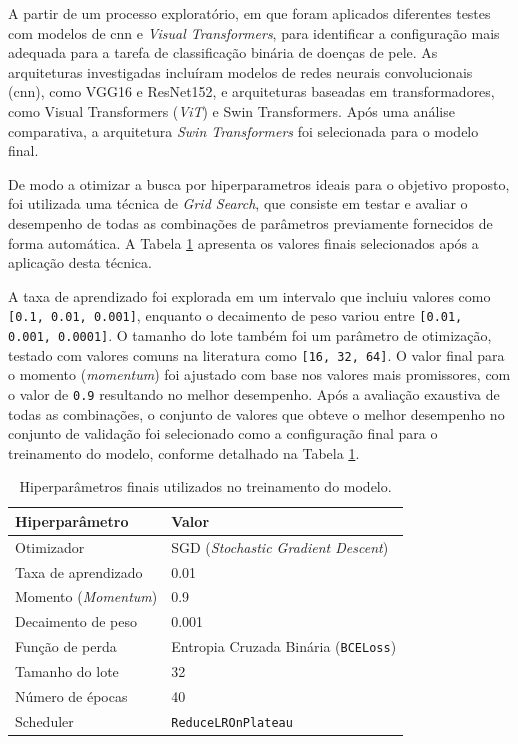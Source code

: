 A partir de um processo exploratório, em que foram aplicados diferentes testes com modelos de \gls{cnn} e \textit{Visual Transformers}, para identificar a configuração mais adequada para a tarefa de classificação binária de doenças de pele. As arquiteturas investigadas incluíram modelos de redes neurais convolucionais (\gls{cnn}), como VGG16 e ResNet152, e arquiteturas baseadas em transformadores, como Visual Transformers (\textit{ViT}) e Swin Transformers. Após uma análise comparativa, a arquitetura \textit{Swin Transformers} foi selecionada para o modelo final.

De modo a otimizar a busca por hiperparametros ideais para o objetivo proposto, foi utilizada uma técnica de \textit{Grid Search}, que consiste em testar e avaliar o desempenho de todas as combinações de parâmetros previamente fornecidos de forma automática. A Tabela \ref{tab: hiperparametros} apresenta os valores finais selecionados após a aplicação desta técnica.

A taxa de aprendizado foi explorada em um intervalo que incluiu valores como \texttt{[0.1, 0.01, 0.001]}, enquanto o decaimento de peso variou entre \texttt{[0.01, 0.001, 0.0001]}. O tamanho do lote também foi um parâmetro de otimização, testado com valores comuns na literatura como \texttt{[16, 32, 64]}. O valor final para o momento (\textit{momentum}) foi ajustado com base nos valores mais promissores, com o valor de \texttt{0.9} resultando no melhor desempenho. Após a avaliação exaustiva de todas as combinações, o conjunto de valores que obteve o melhor desempenho no conjunto de validação foi selecionado como a configuração final para o treinamento do modelo, conforme detalhado na Tabela \ref{tab: hiperparametros}.

\begin{table}[h]
    \centering
    \begin{tabular}{ll}
        \toprule
        \textbf{Hiperparâmetro} & \textbf{Valor} \\
        \midrule
        Otimizador              & SGD (\textit{Stochastic Gradient Descent}) \\
        Taxa de aprendizado     & 0.01 \\
        Momento (\textit{Momentum})     & 0.9 \\
        Decaimento de peso      & 0.001 \\
        Função de perda         & Entropia Cruzada Binária (\texttt{BCELoss}) \\
        Tamanho do lote         & 32 \\
        Número de épocas        & 40 \\
        Scheduler               & \texttt{ReduceLROnPlateau} \\
        \bottomrule
    \end{tabular}
    \caption{Hiperparâmetros finais utilizados no treinamento do modelo.}
    \label{tab: hiperparametros}
\end{table}


